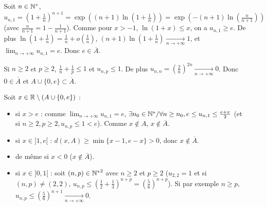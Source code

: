 \begin{solution}
\begin{center}
\end{center}

Soit $n \in \mathbb N^*$, $u_{n,1} = \left(1 + \frac{1}{n}\right)^{n+1} = \exp\left((n+1)\ln\left(1 + \frac{1}{n}\right)\right) = \exp\left(-(n+1)\ln\left(\frac{n}{n+1}\right)\right)$ (avec $\frac{n}{n+1} = 1 - \frac{1}{n+1}$).
Comme pour $x > -1$, $\ln(1 + x) \leq x$, on a $u_{n,1} \geq e$.
De plus $\ln\left(1 + \frac{1}{n}\right) = \frac{1}{n} + o\left(\frac{1}{n}\right)$, $(n+1)\ln\left(1 + \frac{1}{n}\right) \xrightarrow[n \to +\infty]{} 1$, et $\lim_{n \to +\infty} u_{n,1} = e$.
Donc $e \in \overline{A}$.

Si $n \geq 2$ et $p \geq 2$, $\frac{1}{n} + \frac{1}{p} \leq 1$ et $u_{n,p} \leq 1$.
De plus $u_{n,n} = \left(\frac{2}{n}\right)^{2n} \xrightarrow[n \to +\infty]{} 0$.
Donc $0 \in \overline{A}$ et $A \cup \{0, e\} \subset \overline{A}$.

Soit $x \in \mathbb R \setminus (A \cup \{0, e\})$ :
\begin{itemize}
  \item si $x > e$ : comme $\lim_{n \to +\infty} u_{n,1} = e$, $\exists n_0 \in \mathbb N^* / \forall n \geq n_0, e \leq u_{n,1} \leq \frac{e + x}{2}$ (et si $n \geq 2, p \geq 2, u_{n,p} \leq 1 < e$). Comme $x \notin A$, $x \notin \overline{A}$.
  \item si $x \in ]1, e[$ : $d(x, A) \geq \min\{x - 1, e - x\} > 0$, donc $x \notin \overline{A}$.
  \item de même si $x < 0$ ($x \notin \overline{A}$).
  \item si $x \in ]0, 1[$ : soit $(n, p) \in {\mathbb N^*}^2$ avec $n \geq 2$ et $p \geq 2$ ($u_{2,2} = 1$ et si $(n, p) \neq (2, 2)$, $u_{n,p} \leq \left(\frac{1}{2} + \frac{1}{3}\right)^{n+p} = \left(\frac{5}{6}\right)^{n+p}$).
  Si par exemple $n \geq p$, $u_{n,p} \leq \left(\frac{5}{6}\right)^{n+1} \xrightarrow[n \to +\infty]{} 0$.


\end{itemize}
\end{solution}

